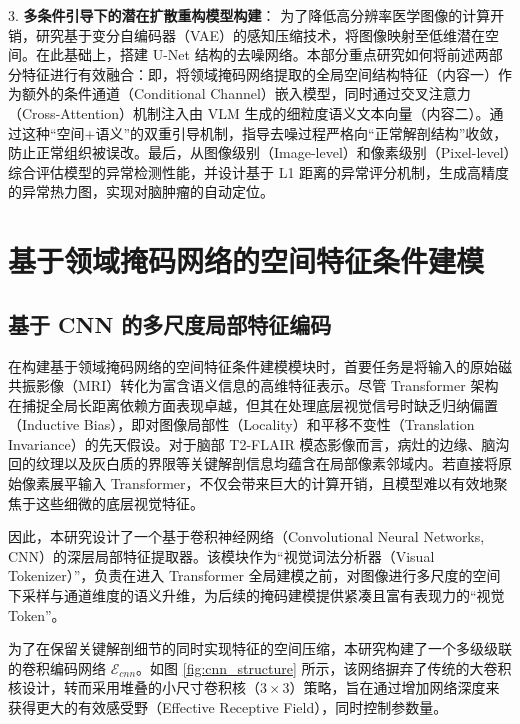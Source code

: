 \documentclass[Win]{xjtuBSThesis}  %
\begin{document}
3. \textbf{多条件引导下的潜在扩散重构模型构建}：
为了降低高分辨率医学图像的计算开销，研究基于变分自编码器（VAE）的感知压缩技术，将图像映射至低维潜在空间。在此基础上，搭建 U-Net 结构的去噪网络。本部分重点研究如何将前述两部分特征进行有效融合：即，将领域掩码网络提取的全局空间结构特征（内容一）作为额外的条件通道（Conditional Channel）嵌入模型，同时通过交叉注意力（Cross-Attention）机制注入由 VLM 生成的细粒度语义文本向量（内容二）。通过这种“空间+语义”的双重引导机制，指导去噪过程严格向“正常解剖结构”收敛，防止正常组织被误改。最后，从图像级别（Image-level）和像素级别（Pixel-level）综合评估模型的异常检测性能，并设计基于 L1 距离的异常评分机制，生成高精度的异常热力图，实现对脑肿瘤的自动定位。














\section{基于领域掩码网络的空间特征条件建模}
\subsection{基于 CNN 的多尺度局部特征编码}
\label{subsec:cnn_encoding}

在构建基于领域掩码网络的空间特征条件建模模块时，首要任务是将输入的原始磁共振影像（MRI）转化为富含语义信息的高维特征表示。尽管 Transformer 架构在捕捉全局长距离依赖方面表现卓越，但其在处理底层视觉信号时缺乏归纳偏置（Inductive Bias），即对图像局部性（Locality）和平移不变性（Translation Invariance）的先天假设。对于脑部 T2-FLAIR 模态影像而言，病灶的边缘、脑沟回的纹理以及灰白质的界限等关键解剖信息均蕴含在局部像素邻域内。若直接将原始像素展平输入 Transformer，不仅会带来巨大的计算开销，且模型难以有效地聚焦于这些细微的底层视觉特征。

因此，本研究设计了一个基于卷积神经网络（Convolutional Neural Networks, CNN）的深层局部特征提取器。该模块作为“视觉词法分析器（Visual Tokenizer）”，负责在进入 Transformer 全局建模之前，对图像进行多尺度的空间下采样与通道维度的语义升维，为后续的掩码建模提供紧凑且富有表现力的“视觉 Token”。


为了在保留关键解剖细节的同时实现特征的空间压缩，本研究构建了一个多级级联的卷积编码网络 $\mathcal{E}_{cnn}$。如图 \ref{fig:cnn_structure} 所示，该网络摒弃了传统的大卷积核设计，转而采用堆叠的小尺寸卷积核（$3 \times 3$）策略，旨在通过增加网络深度来获得更大的有效感受野（Effective Receptive Field），同时控制参数量。
\end{document}
